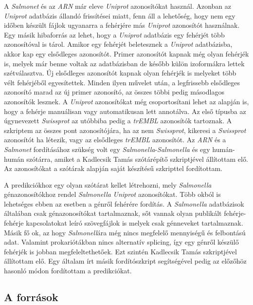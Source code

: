\documentclass[a4paper,12pt]{article}
\begin{document}
			A \textit{Salmonet} és az \textit{ARN} már eleve \textit{Uniprot} azonosítókat használ. Azonban az \textit{Uniprot} adatbázis állandó frissítései miatt, fenn áll a lehetőség, hogy nem egy időben készült fájlok ugyanarra a fehérjére más \textit{Uniprot} azonosítót használnak. Egy másik hibaforrás az lehet, hogy a \textit{Uniprot} adatbázis egy fehérjét több azonosítóval is tárol. Amikor egy fehérjét beletesznek a \textit{Uniprot} adatbázisba, akkor kap egy elsődleges azonosítót. Primer azonosítót kapnak még olyan fehérjék is, melyek már benne voltak az adatbázisban de később külön izoformákra lettek szétválasztva. Új elsődleges azonosítót kapnak olyan fehérjék is melyeket több vélt fehérjéből egyesítettek. Minden ilyen művelet után, a legfrissebb elsődleges azonosító marad az új primer azonosító, az összes többi pedig másodlagos azonosítók lesznek. A \textit{Uniprot} azonosítókat még csoportosítani lehet az alapján is, hogy a fehérje manuálisan vagy automatikusan lett annotálva. Az első típusba az úgynevezett \textit{Swissprot} az utóbbiba pedig a \textit{trEMBL} azonosítók tartoznak. A szkriptem az összes pont azonosítójára, ha az nem \textit{Swissprot}, kikeresi a \textit{Swissprot} azonosítót ha létezik, vagy az elsődleges \textit{trEMBL} azonosítót. Az \textit{ARN} és a \textit{Salmonet} fordításához szükség volt egy \textit{Salmonella}-\textit{Salmonella} és egy humán-humán szótárra, amiket a Kadlecsik Tamás szótárépítő szkriptjével állítottam elő. Az azonosítókat a szótárak alapján saját készítésű szkripttel fordítottam.
			
			A predikciókhoz egy olyan szótárat kellet létrehozni, mely \textit{Salmonella} génazonosítókhoz rendel \textit{Salmonella} \textit{Uniprot} azonosítókat. Több okból is lehetséges ebben az esetben a génről fehérére fordítás. A \textit{Salmonella} adatbázisok általában csak génazonosítókat tartalmaznak, sőt vannak olyan publikált fehérje-fehérje kapcsolatokat leíró szövegfájlok is melyek csak génneveket tartalmaznak. Másik fő ok, az hogy \textit{Salmonell}ára még nincs megfelelő mennyiségű és felbontású adat. Valamint prokariótákban nincs alternatív splicing, így egy génről készülő fehérjék is jobban megfeleltethetőek. Ezt szintén Kadlecsik Tamás szkriptjével állítottam elő. Egy általam írt másik fordítószkript segítségével pedig az előzőhöz hasonló módon fordítottam a predikciókat.
			
			
		\subsection{A források}
\end{document}
